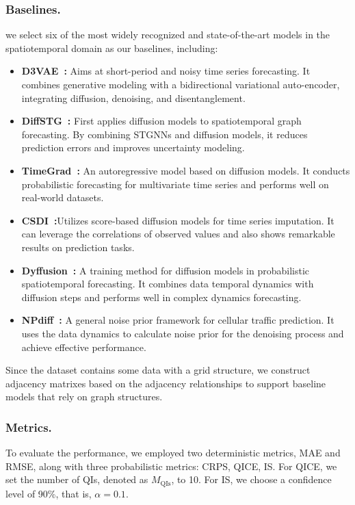 \subsubsection*{\textbf{Baselines.}}
we select six of the most widely recognized and state-of-the-art models in the spatiotemporal domain as our baselines, including:
\begin{itemize}[leftmargin=*]
    \item \textbf{D3VAE~\cite{li2022generative}:} Aims at short-period and noisy time series forecasting. It combines generative modeling with a bidirectional variational auto-encoder, integrating diffusion, denoising, and disentanglement.
    \item \textbf{DiffSTG~\cite{wen2023diffstg}:} First applies diffusion models to spatiotemporal graph forecasting. By combining STGNNs and diffusion models, it reduces prediction errors and improves uncertainty modeling.
    \item \textbf{TimeGrad~\cite{rasul2021autoregressive}:} An autoregressive model based on diffusion models. It conducts probabilistic forecasting for multivariate time series and performs well on real-world datasets.
    \item \textbf{CSDI~\cite{tashiro2021csdi}:}Utilizes score-based diffusion models for time series imputation. It can leverage the correlations of observed values and also shows remarkable results on prediction tasks.
    \item \textbf{Dyffusion~\cite{ruhling2023dyffusion}:} A training method for diffusion models in probabilistic spatiotemporal forecasting. It combines data temporal dynamics with diffusion steps and performs well in complex dynamics forecasting.
    \item \textbf{NPdiff~\cite{sheng2025unveiling}:} A general noise prior framework for cellular traffic prediction. It uses the data dynamics to calculate noise prior for the denoising process and achieve effective
    performance.
\end{itemize}
Since the dataset contains some data with a grid structure, we construct adjacency matrixes based on the adjacency relationships to support baseline models that rely on graph structures. 


\subsubsection*{\textbf{Metrics.}} To evaluate the performance, we employed two deterministic metrics, MAE and RMSE, along with three probabilistic metrics: CRPS, QICE, IS. For QICE, we set the number of QIs, denoted as \(M_{\text{QIs}}\), to 10. For IS, we choose a confidence level of 90\%, that is, \(\alpha = 0.1\). 


